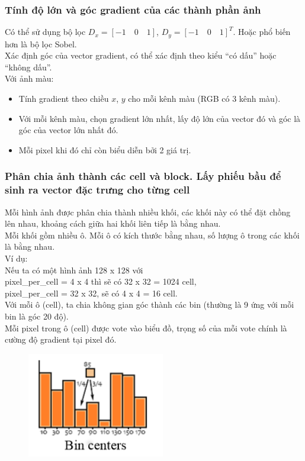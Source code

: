 \documentclass[../report.tex]{subfiles}
\begin{document}
\subsubsection{Tính độ lớn và góc gradient của các thành phần ảnh}
Có thể sử dụng bộ lọc $D_x = [-1 \quad 0 \quad 1]$, 
$D_y = [-1 \quad 0 \quad 1]^T$. Hoặc phổ biến hơn là bộ lọc Sobel. 
\\[3mm]
Xác định góc của vector gradient, có thể xác định 
theo kiểu “có dấu” hoặc “không dấu”. 
\\[3mm]
Với ảnh màu:
\begin{itemize}
\item Tính gradient theo chiều $x$, $y$ 
cho mỗi kênh màu (RGB có 3 kênh màu). 
\item Với mỗi kênh màu, chọn gradient lớn nhất, 
lấy độ lớn của vector đó và góc là góc của vector lớn nhất đó.  
\item Mỗi pixel khi đó chỉ còn biểu diễn bởi 2 giá trị.
\end{itemize}

\subsubsection{Phân chia ảnh thành các cell và block. 
Lấy phiếu bầu để sinh ra vector đặc trưng cho từng cell}
Mỗi hình ảnh được phân chia thành nhiều khối, 
các khối này có thể đặt chồng lên nhau, 
khoảng cách giữa hai khối liên tiếp là bằng nhau. \\[3mm]
Mỗi khối gồm nhiều ô. Mỗi ô có kích thước bằng nhau, 
số lượng ô trong các khối là bằng nhau. \\[3mm]
Ví dụ: \\
Nếu ta có một hình ảnh 128 x 128 với  \\
pixel\_per\_cell = 4 x 4 thì sẽ có 32 x 32 = 1024 cell,  \\
pixel\_per\_cell = 32 x 32, sẽ có 4 x 4 = 16 cell. 
\\[3mm]
Với mỗi ô (cell), ta chia không gian góc thành 
các bin (thường là 9 ứng với mỗi bin là góc 20 độ).
\\[3mm]
Mỗi pixel trong ô (cell) được vote vào biểu đồ, 
trọng số của mỗi vote chính là cường độ gradient tại pixel đó.
\begin{figure}[H]
\centering
\includegraphics[width=6cm]{figures/bins.png}
\end{figure}
\end{document}
